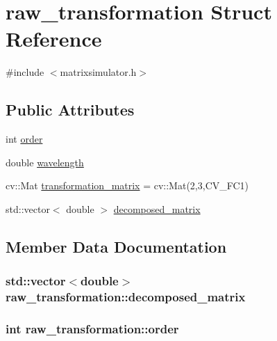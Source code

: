 \hypertarget{structraw__transformation}{}\section{raw\+\_\+transformation Struct Reference}
\label{structraw__transformation}


{\ttfamily \#include $<$matrixsimulator.\+h$>$}

\subsection*{Public Attributes}
\begin{DoxyCompactItemize}
\item 
int \hyperlink{structraw__transformation_a896cd09845802341d970910f7b6a1617}{order}
\item 
double \hyperlink{structraw__transformation_a8cfb4c9736421e670f53d8eebb4d82ef}{wavelength}
\item 
cv\+::\+Mat \hyperlink{structraw__transformation_a664c5ba015a8d2c1cbd10a3787a306f3}{transformation\+\_\+matrix} = cv\+::\+Mat(2,3,C\+V\+\_\+F\+C1)
\item 
std\+::vector$<$ double $>$ \hyperlink{structraw__transformation_ae5c78a8434f7ce62f1f147cf4574dde7}{decomposed\+\_\+matrix}
\end{DoxyCompactItemize}


\subsection{Member Data Documentation}
\subsubsection[{\texorpdfstring{decomposed\+\_\+matrix}{decomposed_matrix}}]{\setlength{\rightskip}{0pt plus 5cm}std\+::vector$<$double$>$ raw\+\_\+transformation\+::decomposed\+\_\+matrix}\hypertarget{structraw__transformation_ae5c78a8434f7ce62f1f147cf4574dde7}{}\label{structraw__transformation_ae5c78a8434f7ce62f1f147cf4574dde7}
\subsubsection[{\texorpdfstring{order}{order}}]{\setlength{\rightskip}{0pt plus 5cm}int raw\+\_\+transformation\+::order}\hypertarget{structraw__transformation_a896cd09845802341d970910f7b6a1617}{}\label{structraw__transformation_a896cd09845802341d970910f7b6a1617}
